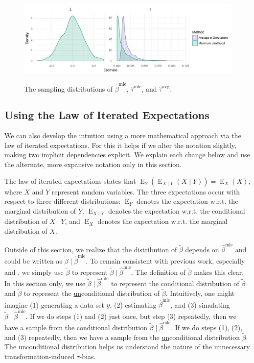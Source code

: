 \documentclass[11pt]{article}
\DeclareMathOperator*{\E}{\text{E}}
\begin{document}
\begin{figure}[h]
\begin{center}
\includegraphics[scale = 0.75]{figs/intuition-sampling.pdf}\\
\vspace{.1in}
\caption{The sampling distributions of $\hat{\beta}^\text{mle}$, $\hat{\tau}^\text{mle}$, and $\hat{\tau}^\text{avg}$.}\label{fig:int-samp}
\end{center}
\end{figure}

\subsection*{Using the Law of Iterated Expectations}

We can also develop the intuition using a more mathematical approach via the law of iterated expectations.
For this it helps if we alter the notation slightly, making two implicit dependencies explicit.
We explain each change below and use the alternate, more expansive notation only in this section.

The law of iterated expectations states that $\E_Y \left( \E_{X \mid Y}(X \mid Y) \right) = \E_X(X)$, where $X$ and $Y$ represent random variables.
The three expectations occur with respect to three different distributions: $\E_Y$ denotes the expectation w.r.t. the marginal distribution of $Y$, $\E_{X \mid Y}$ denotes the expectation w.r.t. the conditional distribution of $X \mid Y$, and $\E_X$ denotes the expectation w.r.t. the marginal distribution of $X$.

Outside of this section, we realize that the distribution of $\tilde{\beta}$ depends on $\hat{\beta}^\text{mle}$ and could be written as $\tilde{\beta} \mid \hat{\beta}^\text{mle}$.
To remain consistent with previous work, especially \cite{KingTomzWittenberg2000} and \cite{Herron1999}, we simply use $\tilde{\beta}$ to represent $\tilde{\beta} \mid \hat{\beta}^\text{mle}$.
The definition of $\tilde{\beta}$ makes this clear.
In this section only, we use $\tilde{\beta} \mid \hat{\beta}^\text{mle}$ to represent the conditional distribution of $\tilde{\beta}$ and $\tilde{\beta}$ to represent the \underline{un}conditional distribution of $\tilde{\beta}$.
Intuitively, one might imagine (1) generating a data set $y$, (2) estimating $\hat{\beta}^\text{mle}$, and (3) simulating $\tilde{\beta} \mid \hat{\beta}^\text{mle}$.
If we do steps (1) and (2) just once, but step (3) repeatedly, then we have a sample from the conditional distribution $\tilde{\beta} \mid \hat{\beta}^\text{mle}$.
If we do steps (1), (2), and (3) repeatedly, then we have a sample from the \underline{un}conditional distribution $\tilde{\beta}$.
The unconditional distribution helps us understand the nature of the unnecessary transformation-induced $\tau$-bias.
\end{document}
